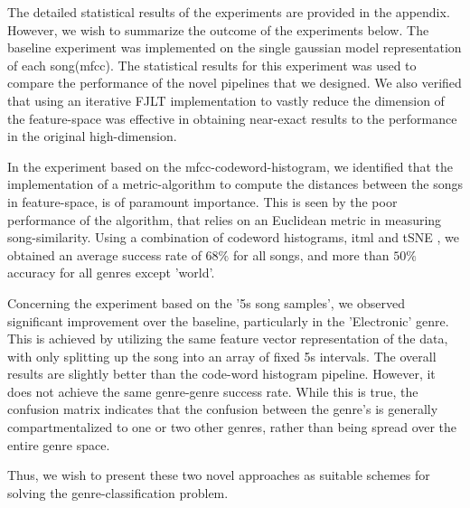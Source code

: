 \documentclass[10pt]{article}
\begin{document}
The detailed statistical results of the experiments are provided in the appendix. However, we wish to summarize the outcome of the experiments below. The baseline experiment was implemented on the single gaussian model representation of each song(mfcc). The statistical results for this experiment was used to compare the performance of the novel pipelines that we designed. We also verified that using an iterative FJLT implementation to vastly reduce the dimension of the feature-space was effective in obtaining near-exact results to the performance in the original high-dimension. 

In the experiment based on the mfcc-codeword-histogram, we identified that the implementation of a metric-algorithm to compute the distances between the songs in feature-space, is of paramount importance. This is seen by the poor performance of the algorithm, that relies on an Euclidean metric in measuring song-similarity. Using a combination of codeword histograms, itml and tSNE , we obtained an average success rate of $68\%$ for all songs, and more than $50\%$ accuracy for all genres except 'world'.

Concerning the experiment based on the '5s song samples', we observed significant improvement over the baseline, particularly in the 'Electronic' genre. This is achieved by utilizing the same feature vector representation of the data, with only splitting up the song into an array of fixed 5s intervals. The overall results are slightly better than the code-word histogram pipeline. However, it does not achieve the same genre-genre success rate. While this is true, the confusion matrix indicates that the confusion between the genre's is generally compartmentalized to one or two other genres, rather than being spread over the entire genre space. 

Thus, we wish to present these two novel approaches  as suitable schemes for solving the genre-classification problem.
\end{document}
